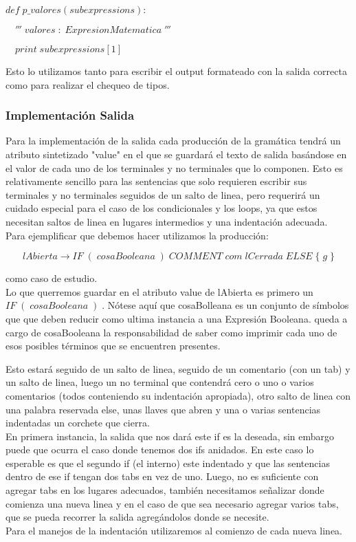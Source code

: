$def\; p\_valores(subexpressions):$

$\quad'''\; valores\; :\; ExpresionMatematica\;'''$

$\quad print\; subexpressions[1]$


Esto lo utilizamos tanto para escribir el output formateado con la salida correcta como para realizar el chequeo de tipos.

\subsubsection{Implementación Salida}

Para la implementación de la salida cada producción de la gramática tendrá un atributo sintetizado "value" en el que se guardará el texto de salida basándose en el valor de cada uno de los terminales y no terminales que lo componen. Esto es relativamente sencillo para las sentencias que solo requieren escribir sus terminales y no terminales seguidos de un salto de linea, pero requerirá un cuidado especial para el caso de los condicionales y los loops, ya que estos necesitan saltos de linea en lugares intermedios y una indentación adecuada.
\\
Para ejemplificar que debemos hacer utilizamos la producción:

$$lAbierta \rightarrow IF\; (\; cosaBooleana\; )\; COMMENT\; com\; lCerrada\; ELSE\; \{\; g\; \}$$ 

como caso de estudio.
\\
Lo que querremos guardar en el atributo value de lAbierta es primero un $IF\; (\; cosaBooleana\; )\;$. Nótese aquí que cosaBolleana es un conjunto de símbolos que que deben reducir como ultima instancia a una Expresión Booleana. queda a cargo de cosaBooleana la responsabilidad de saber como imprimir cada uno de esos posibles términos que se encuentren presentes.

Esto estará seguido de un salto de linea, seguido de un comentario (con un tab) y un salto de linea, luego un no terminal que contendrá cero o uno o varios comentarios (todos conteniendo su indentación apropiada), otro salto de linea con una palabra reservada else, unas llaves que abren y una o varias sentencias indentadas un corchete que cierra.
\\
En primera instancia, la salida que nos dará este if es la deseada, sin embargo puede que ocurra el caso donde tenemos dos ifs anidados. En este caso lo esperable es que el segundo if (el interno) este indentado y que las sentencias dentro de ese if tengan dos tabs en vez de uno. Luego, no es suficiente con agregar tabs en los lugares adecuados, también necesitamos señalizar donde comienza una nueva linea y en el caso de que sea necesario agregar varios tabs, que se pueda recorrer la salida agregándolos donde se necesite.
\\
Para el manejos de la indentación utilizaremos al comienzo de cada nueva linea.

